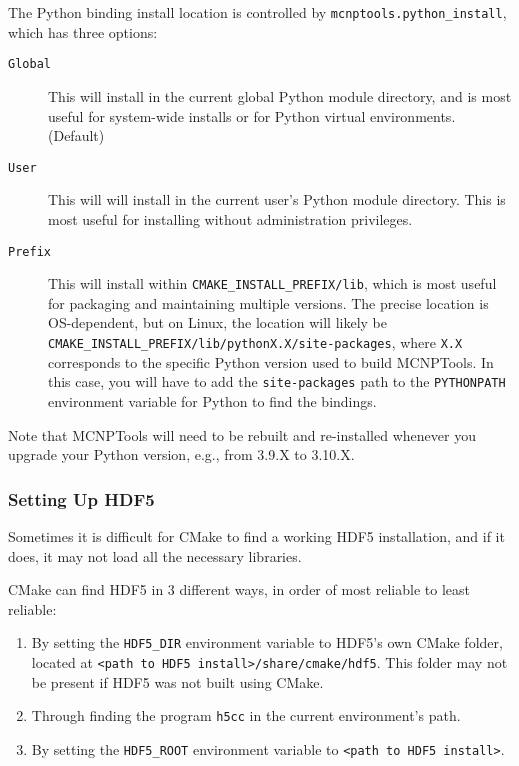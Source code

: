 \documentclass[11pt]{article}
\begin{document}
The Python binding install location is controlled by \texttt{mcnptools.python\_install}, which has three options:
\begin{description}
  \item[\texttt{Global}] This will install in the current global Python module directory, and is most useful for system-wide installs or for Python virtual environments. (Default)
  \item[\texttt{User}] This will will install in the current user's Python module directory.
  This is most useful for installing without administration privileges.
  \item[\texttt{Prefix}] This will install within \texttt{CMAKE\_INSTALL\_PREFIX/lib}, which is most useful for packaging and maintaining multiple versions.
  The precise location is OS-dependent, but on Linux, the location will likely be \texttt{CMAKE\_INSTALL\_PREFIX/lib/pythonX.X/site-packages}, where \texttt{X.X} corresponds to the specific Python version used to build MCNPTools.
  In this case, you will have to add the \texttt{site-packages} path to the \texttt{PYTHONPATH} environment variable for Python to find the bindings.
\end{description}

Note that MCNPTools will need to be rebuilt and re-installed whenever you upgrade your Python version, e.g., from 3.9.X to 3.10.X.

\subsubsection{Setting Up HDF5}\label{sec:setting-up-hdf5}

Sometimes it is difficult for CMake to find a working HDF5 installation, and if it does, it may not load all the necessary libraries.

CMake can find HDF5 in 3 different ways, in order of most reliable to least reliable:
\begin{enumerate}
  \item By setting the \texttt{HDF5\_DIR} environment variable to HDF5's own CMake folder, located at \texttt{<path to HDF5 install>/share/cmake/hdf5}. This folder may not be present if HDF5 was not built using CMake.
  \item Through finding the program \texttt{h5cc} in the current environment's path.
  \item By setting the \texttt{HDF5\_ROOT} environment variable to \texttt{<path to HDF5 install>}.
\end{enumerate}
\end{document}
